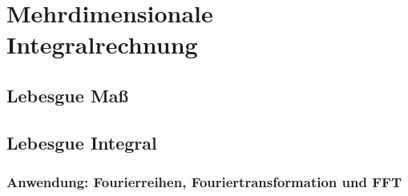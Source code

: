 
\section{Mehrdimensionale Integralrechnung}

\subsection{Lebesgue Maß}

\subsection{Lebesgue Integral}

\subsubsection*{Anwendung: Fourierreihen, Fouriertransformation und FFT} 